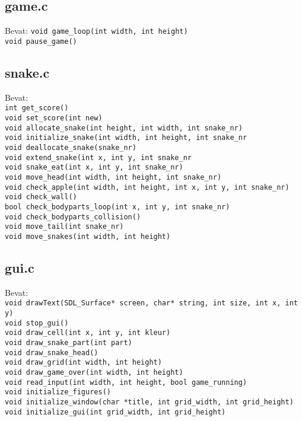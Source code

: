 \documentclass[11pt, oneside]{article}   	%
\begin{document}
\subsection{game.c}
Bevat:
\texttt{void game\_loop(int width, int height)} \\
\texttt{void pause\_game()} \\
\subsection{snake.c}
Bevat: \\
\texttt{int get\_score()} \\
\texttt{void set\_score(int new)} \\
\texttt{void allocate\_snake(int height, int width, int snake\_nr)} \\
\texttt{void initialize\_snake(int width, int height, int snake\_nr} \\
\texttt{void deallocate\_snake(snake\_nr)} \\
\texttt{void extend\_snake(int x, int y, int snake\_nr} \\
\texttt{void snake\_eat(int x, int y, int snake\_nr)} \\
\texttt{void move\_head(int width, int height, int snake\_nr)} \\
\texttt{void check\_apple(int width, int height, int x, int y, int snake\_nr)} \\
\texttt{void check\_wall()} \\
\texttt{bool check\_bodyparts\_loop(int x, int y, int snake\_nr)} \\
\texttt{void check\_bodyparts\_collision()} \\
\texttt{void move\_tail(int snake\_nr)} \\
\texttt{void move\_snakes(int width, int height)} \\

\subsection{gui.c}
Bevat: \\
\texttt{void drawText(SDL\_Surface* screen, char* string, int size, int x, int y)} \\
\texttt{void stop\_gui()} \\
\texttt{void draw\_cell(int x, int y, int kleur)} \\ 
\texttt{void draw\_snake\_part(int part)} \\
\texttt{void draw\_snake\_head()} \\
\texttt{void draw\_grid(int width, int height)} \\
\texttt{void draw\_game\_over(int width, int height)} \\
\texttt{void read\_input(int width, int height, bool game\_running)} \\
\texttt{void initialize\_figures()} \\
\texttt{void initialize\_window(char *title, int grid\_width, int grid\_height) } \\
\texttt{void initialize\_gui(int grid\_width, int grid\_height)} \\
\end{document}
